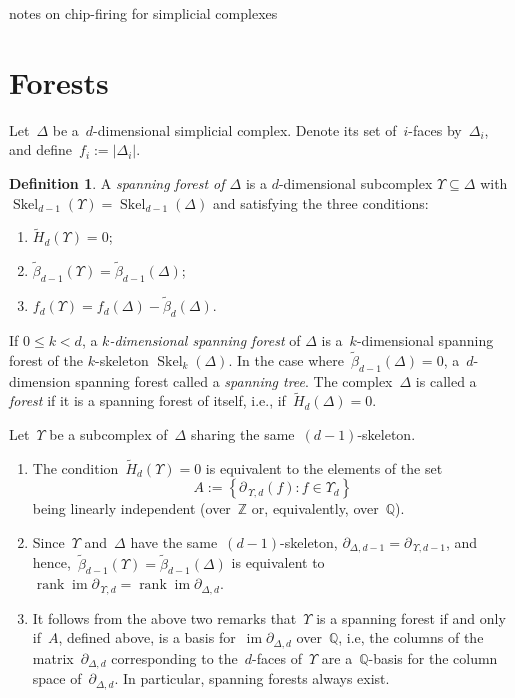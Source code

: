 \documentclass[12pt]{article}
\newcommand{\Z}{\mathbb{Z}}
\newcommand{\Q}{\mathbb{Q}}
\newcommand{\tH}{\widetilde{H}}
\newcommand{\tb}{\tilde{\beta}}
\DeclareMathOperator{\rk}{\mathrm{rank}}
\DeclareMathOperator{\im}{\mathrm{im}}
\DeclareMathOperator{\skel}{Skel}
\newcommand{\pup}[1]{\partial_{\,\Upsilon,{#1}}}
\theoremstyle{definition}
\newtheorem{definition}[theorem]{Definition}
\theoremstyle{remark}
\begin{document}
\centerline{\sc notes on chip-firing for simplicial complexes}
\bigskip

\section{Forests}
Let~$\Delta$ be a~$d$-dimensional simplicial complex.  Denote its set
of~$i$-faces by~$\Delta_i$, and define~$f_i:=|\Delta_i|$.

\begin{definition}\label{def: spanning forest} 
  A {\em spanning forest of $\Delta$} is a $d$-dimensional subcomplex
  $\Upsilon\subseteq\Delta$ with $\skel_{d-1}(\Upsilon)=\skel_{d-1}(\Delta)$ and
  satisfying the three conditions:
  \begin{enumerate}[leftmargin=*]
    \item\label{sst1}  $\tH_d(\Upsilon)=0$;
    \item\label{sst2}  $\tb_{d-1}(\Upsilon)=\tb_{d-1}(\Delta)$;
    \item\label{sst3}  $f_d(\Upsilon) = f_d(\Delta)-\tb_d(\Delta)$.
  \end{enumerate}
  If $0\le k<d$, a \emph{$k$-dimensional spanning forest} of $\Delta$
  is a~$k$-dimensional spanning forest of the $k$-skeleton
  $\skel_{k}(\Delta)$.  In the case where~$\tb_{d-1}(\Delta)=0$, a~$d$-dimension spanning forest called a
  {\em spanning tree}.  The complex~$\Delta$ is called a {\em forest} if it is a
  spanning forest of itself, i.e., if~$\tH_d(\Delta)=0$.
\end{definition}

  Let~$\Upsilon$ be a subcomplex of~$\Delta$ sharing the
same~$(d-1)$-skeleton.
\begin{enumerate}
  \item The condition~$\tH_d(\Upsilon)=0$ is equivalent to the elements of the
    set
    \[
A:=\left\{\pup{d}(f):f\in\Upsilon_d \right\}
    \]
    being linearly independent (over~$\Z$ or, equivalently, over~$\Q$).
  \item Since~$\Upsilon$ and~$\Delta$ have the same~$(d-1)$-skeleton,
    $\partial_{\Delta,d-1}=\pup{d-1}$, and
    hence,~$\tb_{d-1}(\Upsilon)=\tb_{d-1}(\Delta)$ is equivalent
    to~$\rk\im\pup{d}=\rk\im\partial_{\Delta,d}$. 
  \item It follows from the above two remarks that~$\Upsilon$ is a spanning
    forest if and only if~$A$, defined above, is a basis for~$\im\partial_{\Delta,d}$ over~$\Q$,
    i.e, the columns of the matrix~$\partial_{\Delta,d}$ corresponding to
    the~$d$-faces of~$\Upsilon$ are a~$\Q$-basis for the column space
    of~$\partial_{\Delta,d}$.  In particular, spanning forests always exist.
\end{enumerate}
\end{document}
